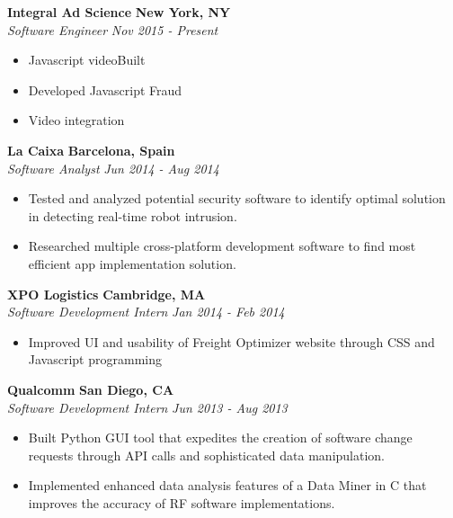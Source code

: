 \documentclass{res}
\begin{document}
\begin{resume}
 {\bf Integral Ad Science} \hfill {\bf New York, NY} \\
{\textit {Software Engineer}} \hfill {\textit {Nov 2015 - Present}} 
\begin{itemize}
\renewcommand{\labelitemi}{\ding{117}}
\itemsep -2pt  
 \item Javascript videoBuilt 
 \item Developed Javascript Fraud 
 \item Video integration
 \end{itemize}

 {\bf La Caixa} \hfill {\bf Barcelona, Spain} \\
{\textit {Software Analyst}} \hfill {\textit {Jun 2014 - Aug 2014}}
 \begin{itemize} 
\renewcommand{\labelitemi}{\ding{117}}
\itemsep -2pt  
 \item	Tested and analyzed potential security software to identify optimal solution in detecting real-time robot intrusion.
 \item  Researched multiple cross-platform development software to find most efficient app implementation solution.
 \end{itemize}

 {\bf XPO Logistics} \hfill {\bf Cambridge, MA} \\
{\textit {Software Development Intern}} \hfill {\textit {Jan 2014 - Feb 2014}} 
 \begin{itemize}
\renewcommand{\labelitemi}{\ding{117}}
\itemsep -2pt  

 \item Improved UI and usability of Freight Optimizer website through CSS and Javascript programming
 \end{itemize}

 {\bf Qualcomm} \hfill {\bf San Diego, CA} \\
{\textit {Software Development Intern}} \hfill {\textit {Jun 2013 - Aug 2013}} 
 \begin{itemize} 
\renewcommand{\labelitemi}{\ding{117}}
\itemsep -2pt  
 \item Built Python GUI tool that expedites the creation of software 
	change requests through API calls and sophisticated data manipulation.
 \item Implemented enhanced data analysis features of a Data Miner in C that
	 improves the accuracy of RF software implementations.
 \end{itemize}


\end{resume}
\end{document}
